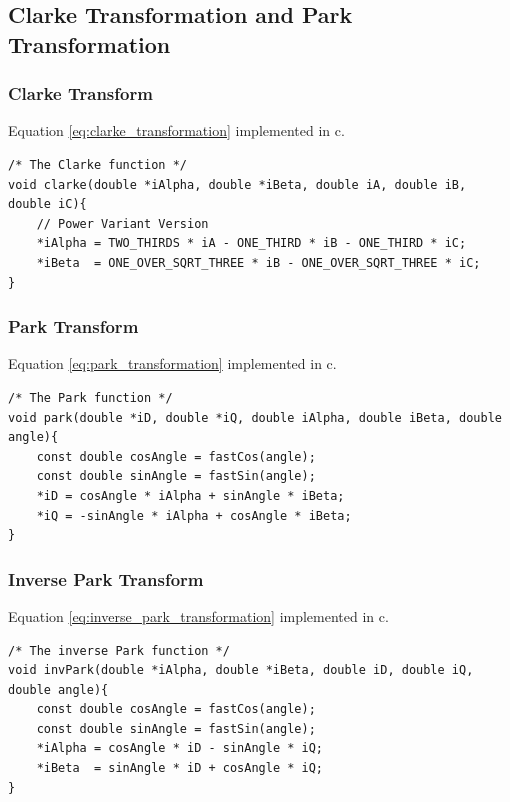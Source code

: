 \subsection{Clarke Transformation and Park Transformation}

\subsubsection*{Clarke Transform}

Equation \ref{eq:clarke_transformation} implemented in c.

\begin{lstlisting}[style=c, caption=Embedded Clarke Transformation., label=code:clarke]
/* The Clarke function */
void clarke(double *iAlpha, double *iBeta, double iA, double iB, double iC){
	// Power Variant Version
	*iAlpha = TWO_THIRDS * iA - ONE_THIRD * iB - ONE_THIRD * iC;
	*iBeta  = ONE_OVER_SQRT_THREE * iB - ONE_OVER_SQRT_THREE * iC;
}
\end{lstlisting}

\subsubsection*{Park Transform}
Equation \ref{eq:park_transformation} implemented in c.

\begin{lstlisting}[style=c, caption=Embedded Park Transformation., label=code:park]
/* The Park function */
void park(double *iD, double *iQ, double iAlpha, double iBeta, double angle){
	const double cosAngle = fastCos(angle);
	const double sinAngle = fastSin(angle);
	*iD = cosAngle * iAlpha + sinAngle * iBeta;
	*iQ = -sinAngle * iAlpha + cosAngle * iBeta;
}
\end{lstlisting}


\subsubsection*{Inverse Park Transform}

Equation \ref{eq:inverse_park_transformation} implemented in c.

\begin{lstlisting}[style=c, caption=Embedded Inverse Park Transformation., label=code:inverse_park]
/* The inverse Park function */
void invPark(double *iAlpha, double *iBeta, double iD, double iQ, double angle){
	const double cosAngle = fastCos(angle);
	const double sinAngle = fastSin(angle);
	*iAlpha = cosAngle * iD - sinAngle * iQ;
	*iBeta  = sinAngle * iD + cosAngle * iQ;
}
\end{lstlisting}



